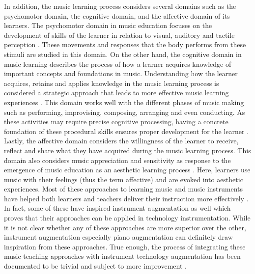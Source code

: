 \documentclass[sigconf, screen, review]{acmart}
\begin{document}
In addition, the music learning process considers several domains such as the psychomotor domain, the cognitive domain, and the affective domain of its learners. The psychomotor domain in music education focuses on the development of skills of the learner in relation to visual, auditory and tactile perception \cite{simpson1966classification}.  These movements and responses that the body performs from these stimuli are studied in this domain. On the other hand, the cognitive domain in music learning describes the process of how a learner acquires knowledge of important concepts and foundations in music. Understanding how the learner acquires, retains and applies knowledge in the music learning process is considered a strategic approach that leads to more effective music learning experiences \cite{hanna2007new}. This domain works well with the different phases of music making such as performing, improvising, composing, arranging and even conducting. As these activities may require precise cognitive processing, having a concrete foundation of these procedural skills ensures proper development for the learner \cite{westerlund2003reconsidering}. Lastly, the affective domain considers the willingness of the learner to receive, reflect and share what they have acquired during the music learning process. This domain also considers music appreciation and sensitivity as response to the emergence of music education as an aesthetic learning process \cite{mccarthy2002music}. Here, learners use music with their feelings (thus the term affective) and are evoked into aesthetic experiences. Most of these approaches to learning music and music instruments have helped both learners and teachers deliver their instruction more effectively \cite{burns2020using}. In fact, some of these have inspired instrument augmentation as well \cite{howard1996kodaly, burns2020using, blackshaw2020wearing, anggoro2020study, comeau2012playing} which proves that their approaches can be applied in technology instrumentation. While it is not clear whether any of these approaches are more superior over the other, instrument augmentation especially piano augmentation can definitely draw inspiration from these approaches. True enough, the process of integrating these music teaching approaches with instrument technology augmentation has been documented to be trivial and subject to more improvement \cite{beckstead2001will}. 
\end{document}
